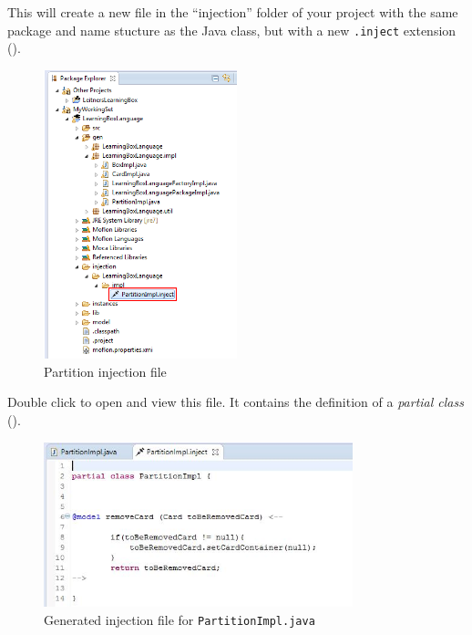 \begin{stepbystep}
\item This will create a new file in the ``injection'' folder of your project with the same package and name stucture as the Java class,
but with a new \texttt{.inject} extension ().

\begin{figure}[htbp]
    \centering
    \includegraphics[width=0.5\textwidth]{../../org.moflon.doc.handbook.02_leitnersLearningBox/5_introToInjections/iImages/eclipse_injectionFolder}
    \caption{Partition injection file}
    \label{eclipse:injection_folder}
\end{figure}

\item Double click to open and view this file. It contains the definition of a \textit{partial class}
().

\begin{figure}[htbp]
    \centering
    \includegraphics[width=0.8\textwidth]{../../org.moflon.doc.handbook.02_leitnersLearningBox/5_introToInjections/iImages/eclipse_partialClassPartition}
    \caption{Generated injection file for \texttt{PartitionImpl.java}}
    \label{eclipse:injection_partialClassPartition}
\end{figure}


\end{stepbystep}
